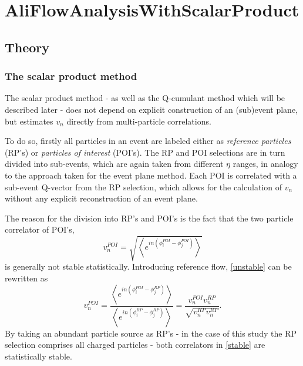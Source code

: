 \documentclass[a4paper]{book}
\numberwithin{equation}{subsection}
\begin{document}
\section{AliFlowAnalysisWithScalarProduct}
\label{SP}
\subsection{Theory}
\subsubsection{The scalar product method}
The scalar product method - as well as the Q-cumulant method which will be described later - does not depend on explicit construction of an (sub)event plane, but estimates $v_n$ directly from multi-particle correlations. 

To do so, firstly all particles in an event are labeled either as \emph{reference particles} (RP's) or \emph{particles of interest} (POI's). The RP and POI selections are in turn divided into sub-events, which are again taken from different $\eta$ ranges, in analogy to the approach taken for the event plane method. Each POI is correlated with a sub-event Q-vector from the RP selection, which allows for the calculation of $v_n$ without any explicit reconstruction of an event plane\cite{sp}. 

The reason for the division into RP's and POI's is the fact that the two particle correlator of POI's,
\begin{equation}\label{unstable}
	v_n^{POI} = \sqrt{ \left< e^{i n (\phi^{POI}_i - \phi^{POI}_j)} \right> }
\end{equation}
is generally not stable statistically. Introducing reference flow, \ref{unstable} can be rewritten as
\begin{equation}\label{stable}
	v_n^{POI} = \frac{ \left< e^{i n (\phi^{POI}_i - \phi^{RP}_j)} \right>}{\left< e^{i n (\phi^{RP}_i - \phi^{RP}_j)} \right>} = \frac{v_n^{POI} v_n^{RP} }{\sqrt{v_n^{RP} v_n^{RP}}}.
\end{equation}
By taking an abundant particle source as RP's - in the case of this study the RP selection comprises all charged particles - both correlators in \ref{stable} are statistically stable. 
\end{document}
